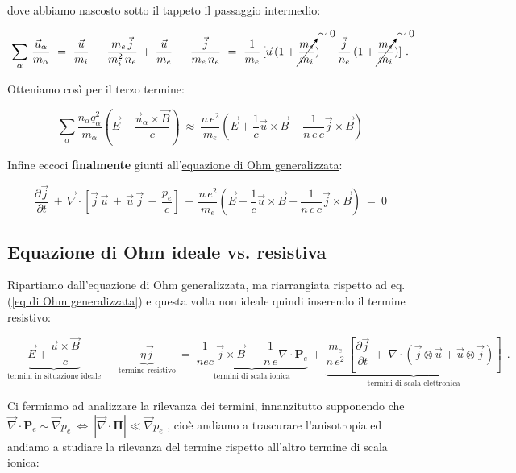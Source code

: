 dove abbiamo nascosto sotto il tappeto il passaggio intermedio:

\[ \sum_\alpha\, \frac{\vec u_\alpha}{m_\alpha}
\ =\ \frac{\vec u}{m_i}\, +\, \frac{m_e \, \vec j}{m_i^2\, n_e}\, +\, \frac{\vec u}{m_e}\, -\,\frac{\vec j}{m_e\, n_e}
\ =\ \frac{1}{m_e}\, [\vec u\, (1+ \cancelto{\sim 0}{\frac{m_e}{m_i}})\, -\, \frac{\vec j}{n_e}\, (1+\cancelto{\sim 0}{\frac{m_e}{m_i}} ) ]\ . \]

Otteniamo così per il terzo termine:

\[\sum_\alpha \frac{n_\alpha q^2_\alpha}{m_\alpha} \left(\vec E + \frac{\vec u_\alpha \times \vec B}{c}\right)\
\approx\ \frac{n\, e^2}{m_e} \left(\vec E + \frac{1}{c} \vec u\times \vec B - \frac{1}{n\, e\, c} \vec j\times \vec B\right)
\]

Infine eccoci \textbf{finalmente} giunti all'\underline{equazione di Ohm generalizzata}:

\begin{equation}
	\label{eq di Ohm generalizzata}
	\boxed{\ \frac{\partial \vec j}{\partial t}\, +\, \vec \nabla\cdot \left[\vec j\,\vec u\, +\, \vec u\, \vec j\, -\, \frac{p_e}{e}\right]\, -\,\frac{n\, e^2}{m_e} \left(\vec E + \frac{1}{c} \vec u\times \vec B - \frac{1}{n\, e\, c} \vec j\times \vec B\right) \ =\ 0\ }
\end{equation}

%
%
%
\subsection{Equazione di Ohm ideale vs. resistiva} 

Ripartiamo dall'equazione di Ohm generalizzata, ma riarrangiata rispetto ad eq.(\ref{eq di Ohm generalizzata}) e questa volta non ideale quindi inserendo il termine resistivo:

\begin{equation}
	\label{Ohm come dio comanda}
	\underset{\text{termini in situazione ideale}}{\underbrace{\vec E + \frac{\vec u\times \vec B}{c}}}\, -\, \underset{\text{termine resistivo}}{\underbrace{\eta\vec j}}\ =\ \underset{\text{termini di scala ionica}}{\underbrace{\frac{1}{n e c} \,\vec j\times \vec B\, -\, \frac{1}{n\, e} \nabla\cdot \mathbf{P}_e}}\, +\, \underset{\text{termini di scala elettronica}}{\underbrace{\frac{m_e}{n\, e^2}\, \left[\frac{\partial \vec j}{\partial t}\, +\, \nabla \cdot (\vec j\otimes \vec u + \vec u \otimes \vec j)\right]}}\ \ .
\end{equation} 

Ci fermiamo ad analizzare la rilevanza dei termini, innanzitutto supponendo che $\vec \nabla\cdot \mathbf{P}_e \sim \vec \nabla p_e\ \iff \ |\vec \nabla\cdot \mathbf{\Pi}|\ll\vec \nabla p_e$ , cioè andiamo a trascurare l'anisotropia ed andiamo a studiare la rilevanza del termine rispetto all'altro termine di scala ionica:

